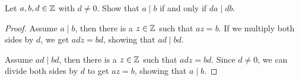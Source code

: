 \begin{statement}{1.1}
Let $a,b,d \in \mathbb Z$ with $d\ne 0$. Show that $a \mid b$ if and only if  $da \mid db$.
\end{statement}
\begin{proof}
Assume $a \mid b$, then there is a $z \in \mathbb Z$ such that $az = b$. If
we multiply both sides by $d$, we get $adz = bd$, showing that $ad
\mid bd$.

Assume $ad \mid bd$, then there is a $z \in \mathbb Z$ such that $adz = bd$. Since
$d\ne 0$, we can divide both sides by $d$ to get $az = b$, showing
that $a \mid b$.
\end{proof}
